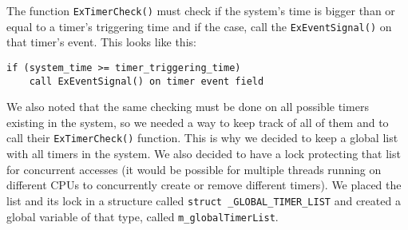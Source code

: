 The function \lstinline|ExTimerCheck()| must check if the system's time is bigger than or equal to a timer's triggering time and if the case, call the \lstinline|ExEventSignal()| on that timer's event. This looks like this:
\begin{lstlisting}
if (system_time >= timer_triggering_time)
    call ExEventSignal() on timer event field
\end{lstlisting}


We also noted that the same checking must be done on all possible timers existing in the system, so we needed a way to keep track of all of them and to call their \lstinline|ExTimerCheck()| function. This is why we decided to keep a global list with all timers in the system. We also decided to have a lock protecting that list for concurrent accesses (it would be possible for multiple threads running on different CPUs to concurrently create or remove different timers). We placed the list and its lock in a structure called \lstinline|struct _GLOBAL_TIMER_LIST| and created a global variable of that type, called \lstinline|m_globalTimerList|.

